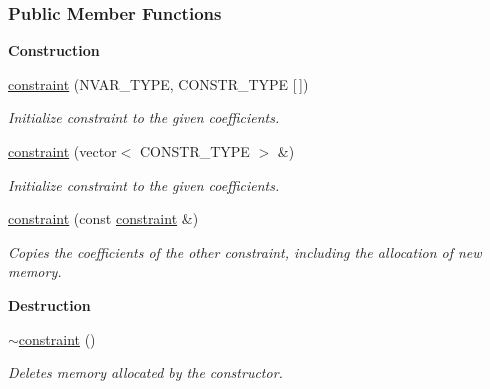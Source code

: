 \subsubsection*{Public Member Functions}
\begin{Indent}\textbf{ Construction}\par
\begin{DoxyCompactItemize}
\item 
\hyperlink{group___c_l_s_solvers_aac499533508fc7e6fcdfad614dbecc48}{constraint} (N\+V\+A\+R\+\_\+\+T\+Y\+PE, C\+O\+N\+S\+T\+R\+\_\+\+T\+Y\+PE \mbox{[}$\,$\mbox{]})
\begin{DoxyCompactList}\small\item\em Initialize constraint to the given coefficients. \end{DoxyCompactList}\item 
\hyperlink{group___c_l_s_solvers_abcf2ec568e0dcfd37c2dc150b738ad2d}{constraint} (vector$<$ C\+O\+N\+S\+T\+R\+\_\+\+T\+Y\+PE $>$ \&)
\begin{DoxyCompactList}\small\item\em Initialize constraint to the given coefficients. \end{DoxyCompactList}\item 
\mbox{\label{group___c_l_s_solvers_a796ee0ed5407fb1e4a4774156f0faac9}} 
\hyperlink{group___c_l_s_solvers_a796ee0ed5407fb1e4a4774156f0faac9}{constraint} (const \hyperlink{group___c_l_s_solvers_classconstraint}{constraint} \&)
\begin{DoxyCompactList}\small\item\em Copies the coefficients of the other constraint, including the allocation of new memory. \end{DoxyCompactList}\end{DoxyCompactItemize}
\end{Indent}
\begin{Indent}\textbf{ Destruction}\par
\begin{DoxyCompactItemize}
\item 
\hyperlink{group___c_l_s_solvers_a02e58b1ce0b271e3daac2da841152582}{$\sim$constraint} ()
\begin{DoxyCompactList}\small\item\em Deletes memory allocated by the constructor. \end{DoxyCompactList}\end{DoxyCompactItemize}
\end{Indent}
